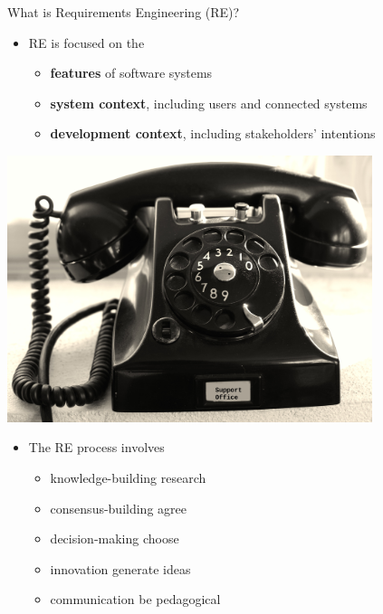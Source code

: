 

\begin{Slide}{What is Requirements Engineering (RE)?}


\begin{minipage}[t]{0.65\textwidth}
\begin{itemize}
\item RE is focused on the
\begin{itemize}
\item \textbf{features} of software systems 
\item \textbf{system context}, including users and connected systems
\item \textbf{development context}, including stakeholders' intentions 
\end{itemize}
\end{itemize}
\end{minipage}%
\begin{minipage}[t]{0.35\textwidth}
\vspace{-1em}\hfill\includegraphics[width=0.8\textwidth]{../img/phone-support}
\end{minipage}%


\begin{itemize}
\item The RE process involves 
\begin{itemize}
\item knowledge-building \hfill research
\item consensus-building \hfill agree
\item decision-making    \hfill choose
\item innovation         \hfill generate ideas
\item communication      \hfill be pedagogical


\end{itemize}
\end{itemize}
\end{Slide}